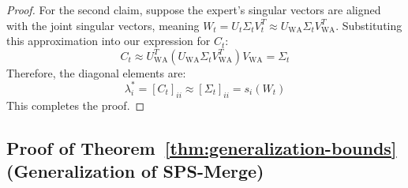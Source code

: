 \documentclass{article}
\theoremstyle{plain}
\theoremstyle{definition}
\theoremstyle{remark}
\begin{document}
\begin{proof}
For the second claim, suppose the expert's singular vectors are aligned with the joint singular vectors, meaning $W_t = U_t \Sigma_t V_t^T \approx U_{\text{WA}} \Sigma_t V_{\text{WA}}^T$. Substituting this approximation into our expression for $C_t$:
\begin{equation}
    C_t \approx U_{\text{WA}}^T (U_{\text{WA}} \Sigma_t V_{\text{WA}}^T) V_{\text{WA}} = \Sigma_t
\end{equation}
Therefore, the diagonal elements are:
\begin{equation}
    \lambda_i^* = [C_t]_{ii} \approx [\Sigma_t]_{ii} = s_i(W_t)
\end{equation}
This completes the proof.
\end{proof}

\subsection{Proof of Theorem~\ref{thm:generalization-bounds} (Generalization of SPS-Merge)}
\label{appendix:generalization-proof}
\end{document}
